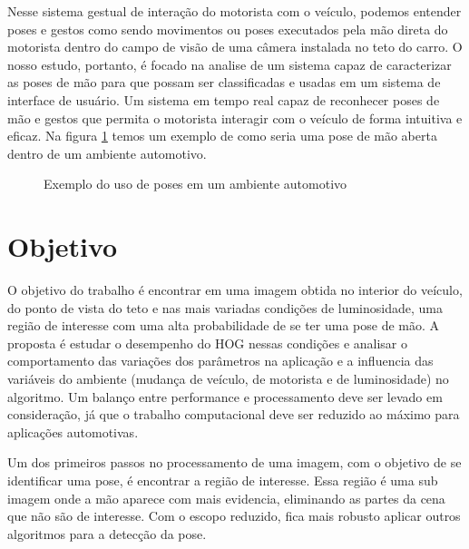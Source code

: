 Nesse sistema gestual de interação do motorista com o veículo, podemos entender poses e gestos como sendo movimentos ou poses executados pela mão direta do motorista dentro do campo de visão de uma câmera instalada no teto do carro.
O nosso estudo, portanto, é focado na analise de um sistema capaz de caracterizar as poses de mão para que possam ser classificadas e usadas em um sistema de interface de usuário. Um sistema em tempo real capaz de reconhecer poses de mão e gestos que permita o motorista interagir com o veículo de forma intuitiva e eficaz. Na figura \ref{fig:visao_aplicacao} temos um exemplo de como seria uma pose de mão aberta dentro de um ambiente automotivo.

\begin{figure}[ht!]
\centering
{}
  \caption{Exemplo do uso de poses em um ambiente automotivo}
  \label{fig:visao_aplicacao}
\end{figure}

\section{Objetivo}

O objetivo do trabalho é encontrar em uma imagem obtida no interior do veículo, do ponto de vista do teto e nas mais variadas condições de luminosidade, uma região de interesse com uma alta probabilidade de se ter uma pose de mão. A proposta é estudar o desempenho do HOG nessas condições e analisar o comportamento das variações dos parâmetros na aplicação e a influencia das variáveis do ambiente (mudança de veículo, de motorista e de luminosidade) no algoritmo.
Um balanço entre performance e processamento deve ser levado em consideração, já que o trabalho computacional deve ser reduzido ao máximo para aplicações automotivas.

Um dos primeiros passos no processamento de uma imagem, com o objetivo de se identificar uma pose, é encontrar a região de interesse. Essa região é uma sub imagem onde a mão aparece com mais evidencia, eliminando as partes da cena que não são de interesse. Com o escopo reduzido, fica mais robusto aplicar outros algoritmos para a detecção da pose.

